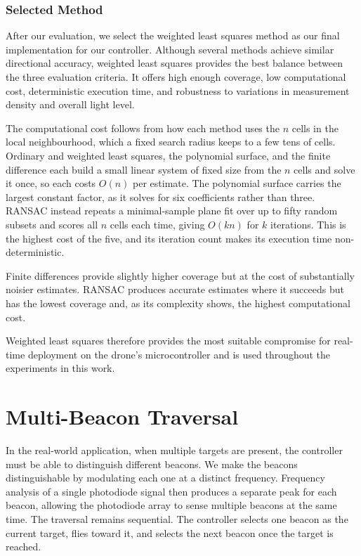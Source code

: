 \subsubsection{Selected Method}

After our evaluation, we select the weighted least squares method as our final implementation for our controller. Although several methods achieve similar directional accuracy, weighted least squares provides the best balance between the three evaluation criteria. It offers high enough coverage, low computational cost, deterministic execution time, and robustness to variations in measurement density and overall light level.

The computational cost follows from how each method uses the $n$ cells in the local neighbourhood, which a fixed search radius keeps to a few tens of cells. Ordinary and weighted least squares, the polynomial surface, and the finite difference each build a small linear system of fixed size from the $n$ cells and solve it once, so each costs $O(n)$ per estimate. The polynomial surface carries the largest constant factor, as it solves for six coefficients rather than three. RANSAC instead repeats a minimal-sample plane fit over up to fifty random subsets and scores all $n$ cells each time, giving $O(kn)$ for $k$ iterations. This is the highest cost of the five, and its iteration count makes its execution time non-deterministic.

Finite differences provide slightly higher coverage but at the cost of substantially noisier estimates. RANSAC produces accurate estimates where it succeeds but has the lowest coverage and, as its complexity shows, the highest computational cost.

Weighted least squares therefore provides the most suitable compromise for real-time deployment on the drone's microcontroller and is used throughout the experiments in this work.

\section{Multi-Beacon Traversal}
\label{sec:multibeacon-separation}

In the real-world application, when multiple targets are present, the controller must be able to distinguish different beacons. We make the beacons distinguishable by modulating each one at a distinct frequency. Frequency analysis of a single photodiode signal then produces a separate peak for each beacon, allowing the photodiode array to sense multiple beacons at the same time. The traversal remains sequential. The controller selects one beacon as the current target, flies toward it, and selects the next beacon once the target is reached.


